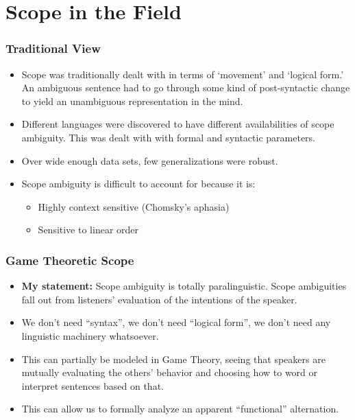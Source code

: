 \documentclass{beamer}
\begin{document}
\section{Scope in the Field}

\begin{frame}
\frametitle{Traditional View}\pause
\begin{itemize}
\item Scope was traditionally dealt with in terms of `movement' and `logical form.' An ambiguous sentence had to go through some kind of post-syntactic change to yield an unambiguous representation in the mind.\pause
\item Different languages were discovered to have different availabilities of scope ambiguity. This was dealt with with formal and syntactic parameters.\pause
\item Over wide enough data sets, few generalizations were robust.\pause
\item Scope ambiguity is difficult to account for because it is:\pause
\begin{itemize}
\item Highly context sensitive (Chomsky's aphasia)\pause
\item Sensitive to linear order 
\end{itemize}
\end{itemize}
\end{frame}

\begin{frame}
\frametitle{Game Theoretic Scope}\pause
\begin{itemize}
\item \textbf{My statement:} Scope ambiguity is totally paralinguistic. Scope ambiguities fall out from listeners' evaluation of the intentions of the speaker.\pause
\item We don't need ``syntax'', we don't need ``logical form'', we don't need any linguistic machinery whatsoever.\pause
\item This can partially be modeled in Game Theory, seeing that speakers are mutually evaluating the others' behavior and choosing how to word or interpret sentences based on that.\pause
\item This can allow us to formally analyze an apparent ``functional'' alternation.
\end{itemize}
\end{frame}
\end{document}

